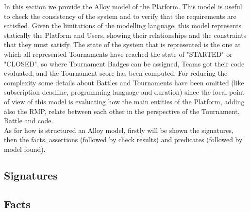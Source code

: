 \newcommand{\showCode}[2]{
    
}
In this section we provide the Alloy model of the Platform. This model is useful to check the consistency of the system and to verify that the requirements are satisfied. Given the limitations of the modelling language, this model represents statically the Platform and Users, showing their relationships and the constraints that they must satisfy. The state of the system that is represented is the one at which all represented Tournaments have reached the state of "STARTED" or "CLOSED", so where Tournament Badges can be assigned, Teams got their code evaluated, and the Tournament score has been computed. For reducing the complexity some details about Battles and Tournaments have been omitted (like subscription deadline, programming language and duration) since the focal point of view of this model is evaluating how the main entities of the Platform, adding also the RMP, relate between each other in the perspective of the Tournament, Battle and code.\\
As for how is structured an Alloy model, firstly will be shown the signatures, then the facts, assertions (followed by check results) and predicates (followed by model found).\\

\subsection{Signatures}
\showCode{4}{76}
\subsection{Facts}
\showCode{82}{238}
